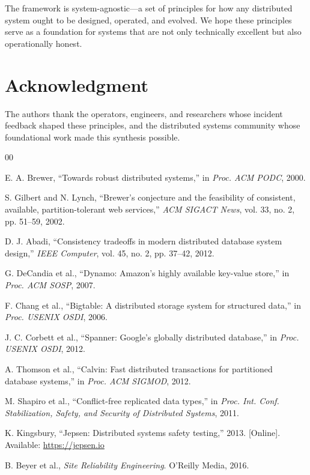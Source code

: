 \documentclass[conference]{IEEEtran}
\begin{document}
The framework is system-agnostic---a set of principles for how any distributed system ought to be designed, operated, and evolved. We hope these principles serve as a foundation for systems that are not only technically excellent but also operationally honest.

\section*{Acknowledgment}

The authors thank the operators, engineers, and researchers whose incident feedback shaped these principles, and the distributed systems community whose foundational work made this synthesis possible.

\begin{thebibliography}{00}

E. A. Brewer, ``Towards robust distributed systems,'' in \textit{Proc. ACM PODC}, 2000.

S. Gilbert and N. Lynch, ``Brewer's conjecture and the feasibility of consistent, available, partition-tolerant web services,'' \textit{ACM SIGACT News}, vol. 33, no. 2, pp. 51--59, 2002.

D. J. Abadi, ``Consistency tradeoffs in modern distributed database system design,'' \textit{IEEE Computer}, vol. 45, no. 2, pp. 37--42, 2012.

G. DeCandia et al., ``Dynamo: Amazon's highly available key-value store,'' in \textit{Proc. ACM SOSP}, 2007.

F. Chang et al., ``Bigtable: A distributed storage system for structured data,'' in \textit{Proc. USENIX OSDI}, 2006.

J. C. Corbett et al., ``Spanner: Google's globally distributed database,'' in \textit{Proc. USENIX OSDI}, 2012.

A. Thomson et al., ``Calvin: Fast distributed transactions for partitioned database systems,'' in \textit{Proc. ACM SIGMOD}, 2012.

M. Shapiro et al., ``Conflict-free replicated data types,'' in \textit{Proc. Int. Conf. Stabilization, Safety, and Security of Distributed Systems}, 2011.

K. Kingsbury, ``Jepsen: Distributed systems safety testing,'' 2013. [Online]. Available: \url{https://jepsen.io}

B. Beyer et al., \textit{Site Reliability Engineering}. O'Reilly Media, 2016.


\end{thebibliography}
\end{document}
